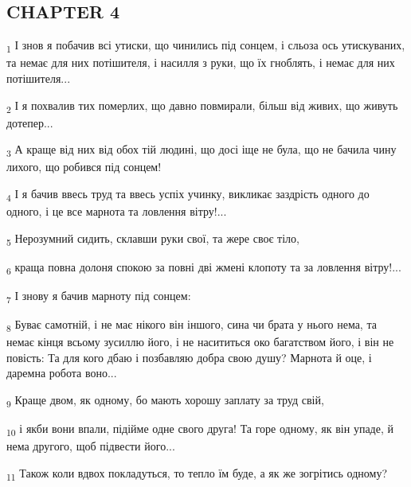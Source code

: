 \subsection{CHAPTER 4}
\begin{tcolorbox}
\textsubscript{1} І знов я побачив всі утиски, що чинились під сонцем, і сльоза ось утискуваних, та немає для них потішителя, і насилля з руки, що їх гноблять, і немає для них потішителя...
\end{tcolorbox}
\begin{tcolorbox}
\textsubscript{2} І я похвалив тих померлих, що давно повмирали, більш від живих, що живуть дотепер...
\end{tcolorbox}
\begin{tcolorbox}
\textsubscript{3} А краще від них від обох тій людині, що досі іще не була, що не бачила чину лихого, що робився під сонцем!
\end{tcolorbox}
\begin{tcolorbox}
\textsubscript{4} І я бачив ввесь труд та ввесь успіх учинку, викликає заздрість одного до одного, і це все марнота та ловлення вітру!...
\end{tcolorbox}
\begin{tcolorbox}
\textsubscript{5} Нерозумний сидить, склавши руки свої, та жере своє тіло,
\end{tcolorbox}
\begin{tcolorbox}
\textsubscript{6} краща повна долоня спокою за повні дві жмені клопоту та за ловлення вітру!...
\end{tcolorbox}
\begin{tcolorbox}
\textsubscript{7} І знову я бачив марноту під сонцем:
\end{tcolorbox}
\begin{tcolorbox}
\textsubscript{8} Буває самотній, і не має нікого він іншого, сина чи брата у нього нема, та немає кінця всьому зусиллю його, і не насититься око багатством його, і він не повість: Та для кого дбаю і позбавляю добра свою душу? Марнота й оце, і даремна робота воно...
\end{tcolorbox}
\begin{tcolorbox}
\textsubscript{9} Краще двом, як одному, бо мають хорошу заплату за труд свій,
\end{tcolorbox}
\begin{tcolorbox}
\textsubscript{10} і якби вони впали, підійме одне свого друга! Та горе одному, як він упаде, й нема другого, щоб підвести його...
\end{tcolorbox}
\begin{tcolorbox}
\textsubscript{11} Також коли вдвох покладуться, то тепло їм буде, а як же зогрітись одному?
\end{tcolorbox}
